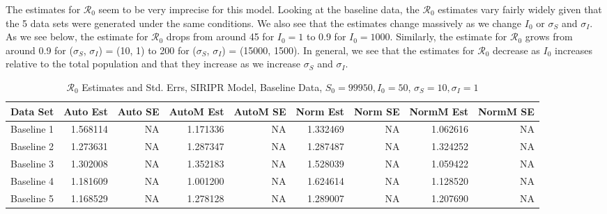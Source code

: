 \documentclass[12pt]{article}
\newcommand{\rr}{\ensuremath{\mathcal{R}_0}}
\begin{document}
The estimates for $\rr$ seem to be very imprecise for this model. Looking at the baseline data, the $\rr$ estimates vary fairly widely given that the 5 data sets were generated under the same conditions. We also see that the estimates change massively as we change $I_0$ or $\sigma_S$ and $\sigma_I$. As we see below, the estimate for $\rr$ drops from around 45 for $I_0 = 1$ to 0.9 for $I_0 = 1000$. Similarly, the estimate for $\rr$ grows from around 0.9 for ($\sigma_S$, $\sigma_I$) = (10, 1) to 200 for ($\sigma_S$, $\sigma_I$) = (15000, 1500). In general, we see that the estimates for $\rr$ decrease as $I_0$ increases relative to the total population and that they increase as we increase 
$\sigma_S$ and $\sigma_I$.

\begin{table}[H]
	
	\caption{$\rr$ Estimates and Std. Errs, SIRIPR Model,
		Baseline Data, $S_0 = 99950, I_0 = 50$, 
		$\sigma_S = 10, \sigma_I = 1$}
	\begin{footnotesize}
		\hskip -1cm
	\begin{tabular}{l|r|r|r|r|r|r|r|r}
		\hline
		Data Set & Auto Est & Auto SE & AutoM Est & AutoM SE & Norm Est & Norm SE & NormM Est & NormM SE\\
		\hline
		Baseline 1 & 1.568114 & NA & 1.171336 & NA & 1.332469 & NA & 1.062616 & NA\\
		\hline
		Baseline 2 & 1.273631 & NA & 1.287347 & NA & 1.287487 & NA & 1.324252 & NA\\
		\hline
		Baseline 3 & 1.302008 & NA & 1.352183 & NA & 1.528039 & NA & 1.059422 & NA\\
		\hline
		Baseline 4 & 1.181609 & NA & 1.001200 & NA & 1.624614 & NA & 1.128520 & NA\\
		\hline
		Baseline 5 & 1.168529 & NA & 1.278128 & NA & 1.289007 & NA & 1.207690 & NA\\
		\hline
	\end{tabular}
\end{footnotesize}
\end{table}
\end{document}
